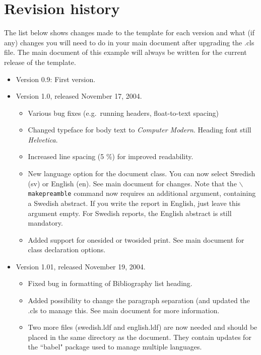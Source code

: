 \section{Revision history}
The list below shows changes made to the template for each version
and what (if any) changes you will need to do in your main
document after upgrading the .cls file. The main document of this
example will always be written for the current release of the
template.
%
\begin{itemize}
    \item Version 0.9: First version.
    \item Version 1.0, released November 17, 2004.
    \begin{itemize}
        \item Various bug fixes (e.g.\ running headers,
        float-to-text spacing)
        \item Changed typeface for body text to \textit{Computer
        Modern}. Heading font still \textit{Helvetica}.
        \item Increased line spacing (5 \%) for improved
        readability.
        \item New language option for the document class. You can
        now select Swedish (sv) or English (en). See main document
        for changes. Note that the
        \texttt{$\backslash$makepreamble} command now requires an
        additional argument, containing a Swedish abstract. If you
        write the report in English, just leave this argument
        empty. For Swedish reports, the English abstract is still
        mandatory.
        \item Added support for onesided or twosided print. See
        main document for class declaration options.
    \end{itemize}
    \item Version 1.01, released November 19, 2004.
    \begin{itemize}
        \item Fixed bug in formatting of Bibliography list
        heading.
        \item Added possibility to change the paragraph
        separation (and updated the .cls to manage this. See main
        document for more information.
        \item Two more files (swedish.ldf and english.ldf) are now needed and should be placed
        in the same directory as the document. They contain
        updates for the ``babel" package used to manage multiple
        languages.
    \end{itemize}

\end{itemize}
